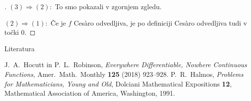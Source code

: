 \documentclass[10]{beamer}
\newenvironment{dokaz}{\begin{proof}[\bfseries\upshape\proofname]}{\end{proof}}
\begin{document}
\begin{frame}
    \begin{dokaz}
        $(3) \Rightarrow (2): $ To smo pokazali v zgornjem zgledu.
        \pause

        \medskip
        $(2) \Rightarrow (1): $ Če je $f$ Ces\`{a}ro odvedljiva, je po definiciji Ces\`{a}ro odvedljiva tudi v točki $0$.
    \end{dokaz}
\end{frame}

\begin{frame}
    
\end{frame}

\begin{frame}{Literatura}
    \begin{thebibliography}{1}
        J.~A.~Hocutt in P.~L.~Robinson, \emph{Everywhere Differentiable, Nowhere Continuous Functions}, Amer.~Math.~Monthly \textbf{125} (2018) 923--928.
        P.~R.~Halmos, \emph{Problems for Mathematicians, Young and Old}, Dolciani Mathematical Expositions \textbf{12}, Mathematical Association of America, Washington, 1991.
    \end{thebibliography}
\end{frame}
\end{document}
